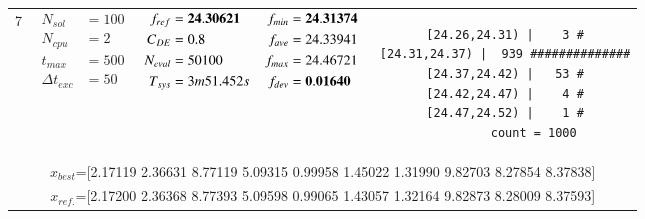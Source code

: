 \begin{table*} [!t]
\begin{tabular}[c]{ccccc}
7
&
{$\!\begin{aligned}
    N_{sol}        &= 100 \\
	N_{cpu}        &= 2 \\
	t_{max}        &= 500 \\
	\Delta t_{exc} &= 50
\end{aligned}$}
&
{$\!\begin{aligned}
	f_{ref} &= {\bf 24.30621} \\
	C_{DE}   &= 0.8 \\
	N_{eval} &= 50100 \\
	T_{sys}  &= 3m51.452s
\end{aligned}$}
&
{$\!\begin{aligned}
    f_{min} &= {\bf 24.31374} \\
    f_{ave} &= 24.33941 \\
    f_{max} &= 24.46721 \\
    f_{dev} &= {\bf 0.01640}
\end{aligned}$}
&
\begin{minipage}{4.1cm} \fontsize{5pt}{6pt}
\begin{verbatim}
 [24.26,24.31) |    3 #
 [24.31,24.37) |  939 ##############
 [24.37,24.42) |   53 #
 [24.42,24.47) |    4 #
 [24.47,24.52) |    1 #
         count = 1000
 \end{verbatim}
\end{minipage} \\
\multicolumn{5}{c}{{\scriptsize $x_{best}$=[2.17119 2.36631 8.77119 5.09315 0.99958 1.45022 1.31990 9.82703 8.27854 8.37838]}} \\
\multicolumn{5}{c}{{\scriptsize $x_{ref.}$=[2.17200 2.36368 8.77393 5.09598 0.99065 1.43057 1.32164 9.82873 8.28009 8.37593]}} \\

\hline




\end{tabular}
\end{table*}
